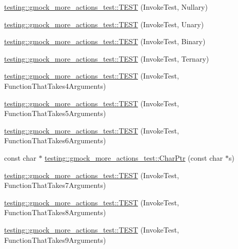 \begin{DoxyCompactItemize}
\item 
\mbox{\hyperlink{namespacetesting_1_1gmock__more__actions__test_a9c5fbd26c6cc6ed31aed5bafb2fa8e5c}{testing\+::gmock\+\_\+more\+\_\+actions\+\_\+test\+::\+T\+E\+ST}} (Invoke\+Test, Nullary)
\item 
\mbox{\hyperlink{namespacetesting_1_1gmock__more__actions__test_a28b57a9f9d38574b7c033988ad528ddd}{testing\+::gmock\+\_\+more\+\_\+actions\+\_\+test\+::\+T\+E\+ST}} (Invoke\+Test, Unary)
\item 
\mbox{\hyperlink{namespacetesting_1_1gmock__more__actions__test_a906bd5cc7aa38e2cc861a9732481fce7}{testing\+::gmock\+\_\+more\+\_\+actions\+\_\+test\+::\+T\+E\+ST}} (Invoke\+Test, Binary)
\item 
\mbox{\hyperlink{namespacetesting_1_1gmock__more__actions__test_a424fb6113c6c1ab2157edf854a4ae9fe}{testing\+::gmock\+\_\+more\+\_\+actions\+\_\+test\+::\+T\+E\+ST}} (Invoke\+Test, Ternary)
\item 
\mbox{\hyperlink{namespacetesting_1_1gmock__more__actions__test_a17f41c1f7f180371d4d240089cdff0dd}{testing\+::gmock\+\_\+more\+\_\+actions\+\_\+test\+::\+T\+E\+ST}} (Invoke\+Test, Function\+That\+Takes4\+Arguments)
\item 
\mbox{\hyperlink{namespacetesting_1_1gmock__more__actions__test_a3b6b1b682295a1d04d57374445359e94}{testing\+::gmock\+\_\+more\+\_\+actions\+\_\+test\+::\+T\+E\+ST}} (Invoke\+Test, Function\+That\+Takes5\+Arguments)
\item 
\mbox{\hyperlink{namespacetesting_1_1gmock__more__actions__test_a9a6c89b83ba253838d05d7ee5da7d954}{testing\+::gmock\+\_\+more\+\_\+actions\+\_\+test\+::\+T\+E\+ST}} (Invoke\+Test, Function\+That\+Takes6\+Arguments)
\item 
const char $\ast$ \mbox{\hyperlink{namespacetesting_1_1gmock__more__actions__test_a1dca0066cfa8595506df9bd0be2148db}{testing\+::gmock\+\_\+more\+\_\+actions\+\_\+test\+::\+Char\+Ptr}} (const char $\ast$s)
\item 
\mbox{\hyperlink{namespacetesting_1_1gmock__more__actions__test_af4756ff87444dc6deb438a350ab5527f}{testing\+::gmock\+\_\+more\+\_\+actions\+\_\+test\+::\+T\+E\+ST}} (Invoke\+Test, Function\+That\+Takes7\+Arguments)
\item 
\mbox{\hyperlink{namespacetesting_1_1gmock__more__actions__test_a48d99224a323afa3c9772a868dd60214}{testing\+::gmock\+\_\+more\+\_\+actions\+\_\+test\+::\+T\+E\+ST}} (Invoke\+Test, Function\+That\+Takes8\+Arguments)
\item 
\mbox{\hyperlink{namespacetesting_1_1gmock__more__actions__test_a65d674aacb46d8bf79dbdfe0d49df442}{testing\+::gmock\+\_\+more\+\_\+actions\+\_\+test\+::\+T\+E\+ST}} (Invoke\+Test, Function\+That\+Takes9\+Arguments)

\end{DoxyCompactItemize}
